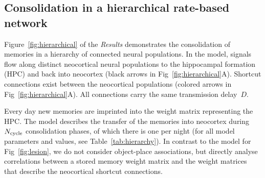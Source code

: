 \newpage
\subsection{Consolidation in a hierarchical rate-based network}
\label{ssec:ppt_methods_hierarchy}

Figure~\ref{fig:hierarchical} of the {\em Results} demonstrates the consolidation of memories in a hierarchy of connected neural populations.
In the model, signals flow along distinct neocortical neural populations to the hippocampal formation (HPC) and back into neocortex (black arrows in Fig~\ref{fig:hierarchical}A).
Shortcut connections exist between the neocortical populations (colored arrows in Fig~\ref{fig:hierarchical}A). All connections carry the same transmission delay~$D$.

Every day new memories are imprinted into the weight matrix representing the HPC. The model describes the transfer of the memories into neocortex during $N_{\rm cycle}$ consolidation phases, of which there is one per night (for all model parameters and values, see Table~\ref{tab:hierarchy}). In contrast to the model for Fig~\ref{fig:lesion}, we do not consider object-place associations, but directly analyse correlations between a stored memory weight matrix and the weight matrices that describe the neocortical shortcut connections.


